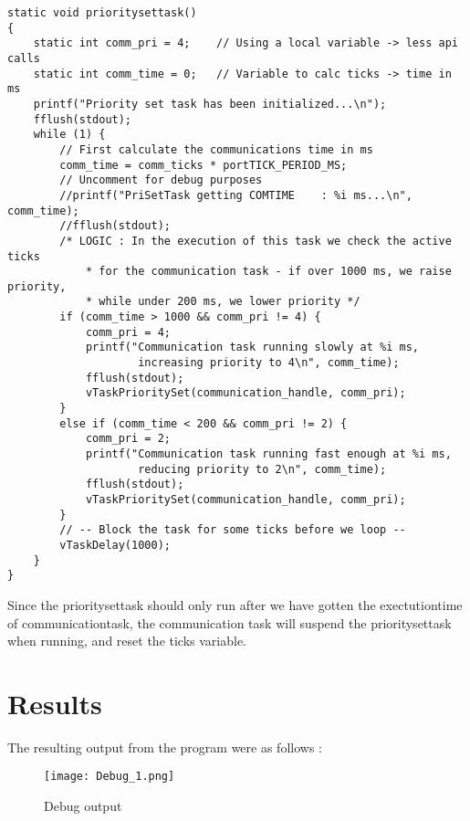 \documentclass[12pt,fleqn,leqno,letterpaper]{article}
\begin{document}
        \begin{verbatim}
static void prioritysettask()
{
    static int comm_pri = 4;    // Using a local variable -> less api calls
    static int comm_time = 0;	// Variable to calc ticks -> time in ms
    printf("Priority set task has been initialized...\n");
    fflush(stdout);
    while (1) {
        // First calculate the communications time in ms
        comm_time = comm_ticks * portTICK_PERIOD_MS;
        // Uncomment for debug purposes
        //printf("PriSetTask getting COMTIME    : %i ms...\n", comm_time);
        //fflush(stdout);
        /* LOGIC : In the execution of this task we check the active ticks
            * for the communication task - if over 1000 ms, we raise priority,
            * while under 200 ms, we lower priority */
        if (comm_time > 1000 && comm_pri != 4) {
            comm_pri = 4;
            printf("Communication task running slowly at %i ms,
                    increasing priority to 4\n", comm_time);
            fflush(stdout);
            vTaskPrioritySet(communication_handle, comm_pri);
        }
        else if (comm_time < 200 && comm_pri != 2) {
            comm_pri = 2;
            printf("Communication task running fast enough at %i ms,
                    reducing priority to 2\n", comm_time);
            fflush(stdout);
            vTaskPrioritySet(communication_handle, comm_pri);
        }
        // -- Block the task for some ticks before we loop --
        vTaskDelay(1000);
    }
}
        \end{verbatim}

        Since the prioritysettask should only run after we have gotten the exectutiontime of communicationtask,
        the communication task will suspend the prioritysettask when running, and reset the ticks variable. \\

    \section*{Results}

        The resulting output from the program were as follows : \\

        \begin{figure}[h]
            \centering
            \texttt{[image: Debug\_1.png]}
            \caption{Debug output}
            \label{figure:debug1}
        \end{figure}
\end{document}
